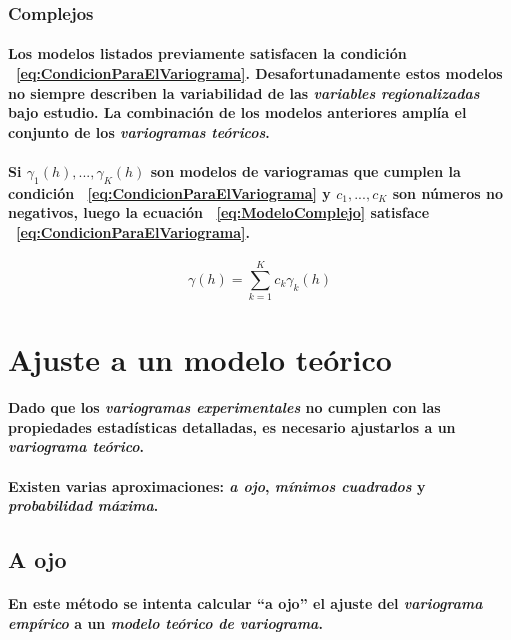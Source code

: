 \subsubsection{Complejos}
\paragraph{
Los modelos listados previamente satisfacen la condición ~\ref{eq:CondicionParaElVariograma}. Desafortunadamente estos modelos no siempre describen la variabilidad de las \emph{variables regionalizadas} bajo estudio. La combinación de los modelos anteriores amplía el conjunto de los \emph{variogramas teóricos}.
}
\paragraph{
Si $\gamma_1(h),...,\gamma_K(h)$ son modelos de variogramas que cumplen la condición ~\ref{eq:CondicionParaElVariograma} y $c_1,...,c_K$ son números no negativos, luego la ecuación ~\ref{eq:ModeloComplejo} satisface ~\ref{eq:CondicionParaElVariograma}.
}
\begin{equation}
\gamma(h) = \sum_{k=1}^K c_k \gamma_k(h)
\label{eq:ModeloComplejo}
\end{equation}



\section{Ajuste a un modelo teórico}
\paragraph{
Dado que los \emph{variogramas experimentales} no cumplen con las propiedades estadísticas detalladas, es necesario ajustarlos a un \emph{variograma teórico}.
}
\paragraph{
Existen varias aproximaciones: \emph{a ojo}, \emph{mínimos cuadrados} y \emph{probabilidad máxima}.
}


\subsection{A ojo}
\paragraph{
En este método se intenta calcular ``a ojo'' el ajuste del \emph{variograma empírico} a un \emph{modelo teórico de variograma}.
}
